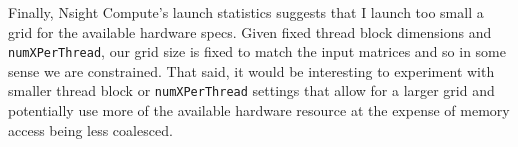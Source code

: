 \documentclass[12pt,letterpaper,twoside]{article}
\begin{document}
Finally, Nsight Compute's launch statistics suggests that I launch too small a grid for the 
available hardware specs. Given fixed thread block dimensions and \texttt{numXPerThread}, 
our grid size is fixed to match the input matrices and so in some sense we are constrained. That 
said, it would be interesting to experiment with smaller thread block or \texttt{numXPerThread} 
settings that allow for a larger grid and potentially use more of the available hardware 
resource at the expense of memory access being less coalesced. 
\end{document}
